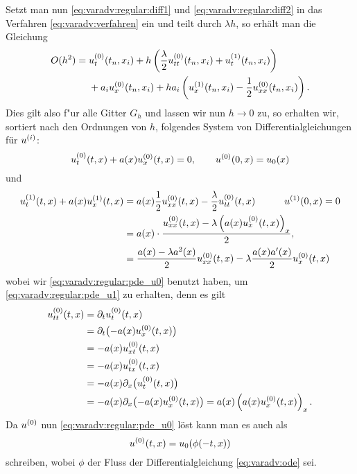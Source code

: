 Setzt man nun \eqref{eq:varadv:regular:diff1} und \eqref{eq:varadv:regular:diff2} in das Verfahren \eqref{eq:varadv:verfahren} ein und teilt durch $\lambda h$, so erhält man die Gleichung
\begin{align*}
\begin{split}
O(h^2) ={}& u^{(0)}_t (t_n, x_i) + h \left( \frac \lambda 2 u^{(0)}_{tt}(t_n, x_i) + u^{(1)}_t(t_n, x_i) \right)\\
          & + a_i u^{(0)}_x(t_n, x_i) + h a_i \left( u^{(1)}_x(t_n, x_i) - \frac 12 u^{(0)}_{xx}(t_n, x_i) \right).
\end{split}\end{align*}
Dies gilt also f"ur alle Gitter $G_h$ und lassen wir nun $h \to 0$ zu, so erhalten wir, sortiert nach den Ordnungen von $h$, folgendes System von Differentialgleichungen für $u^{(i)}$:
\begin{equation}\label{eq:varadv:regular:pde_u0}
u^{(0)}_t(t, x) + a(x) u^{(0)}_x(t,x) = 0, \qquad u^{(0)}(0, x) = u_0(x)
\end{equation}
und
\begin{align}\label{eq:varadv:regular:pde_u1}
u^{(1)}_t(t, x) + a(x) u^{(1)}_x(t, x) &= a(x) \frac 12 u^{(0)}_{xx}(t, x) - \frac \lambda 2 u^{(0)}_{tt}(t, x) \qquad \quad u^{(1)}(0, x) = 0\notag\\
&= a(x) \cdot \frac{u^{(0)}_{xx}(t,x) - \lambda \left( a(x) u^{(0)}_x(t,x) \right)_x}{2},\\
\label{eq:varadv:regular:pde_u1_richtig}
&=  \frac {a(x) - \lambda a^2(x)}{2} u^{(0)}_{xx}(t,x) - \lambda \frac{a(x) a'(x)}{2} u^{(0)}_x(t,x)
\end{align}
wobei wir \eqref{eq:varadv:regular:pde_u0} benutzt haben, um \eqref{eq:varadv:regular:pde_u1} zu erhalten, denn es gilt
\begin{align*}
u^{(0)}_{tt}(t,x) &= \partial_t u^{(0)}_t(t,x)\\
              &= \partial_t \bigl( - a(x) u^{(0)}_x(t,x) \bigr)\\
              &= - a(x) u^{(0)}_{xt}(t,x)\\
              &= -a(x) u^{(0)}_{tx}(t,x)\\
              &= - a(x) \partial_x \bigl( u^{(0)}_t(t,x) \bigr)\\
              &= - a(x) \partial_x \bigl( - a(x) u^{(0)}_x(t,x) \bigr) = a(x) \left( a(x) u^{(0)}_x(t,x) \right)_x.
\end{align*}
Da $u^{(0)}$ nun \eqref{eq:varadv:regular:pde_u0} löst kann man es auch als
\[ u^{(0)}(t,x) = u_0(\phi(-t,x)) \]
schreiben, wobei $\phi$ der Fluss der Differentialgleichung \eqref{eq:varadv:ode} sei.

